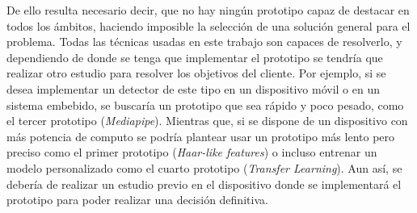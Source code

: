 De ello resulta necesario decir, que no hay ningún prototipo capaz de destacar en todos los ámbitos, haciendo imposible la selección de una solución general para el problema. Todas las técnicas usadas en este trabajo son capaces de resolverlo, y dependiendo de donde se tenga que implementar el prototipo se tendría que realizar otro estudio para resolver los objetivos del cliente. Por ejemplo,  si se desea implementar un detector de este tipo en un dispositivo móvil o en un sistema embebido, se buscaría un prototipo que sea rápido y poco pesado, como el tercer prototipo (\textit{Mediapipe}). Mientras que, si se dispone de un dispositivo con más potencia de computo se podría plantear usar un prototipo más lento pero preciso como el primer prototipo (\textit{Haar-like features}) o incluso entrenar un modelo personalizado como el cuarto prototipo (\textit{Transfer Learning}). Aun así, se debería de realizar un estudio previo en el dispositivo donde se implementará el prototipo para poder realizar una decisión definitiva.  


